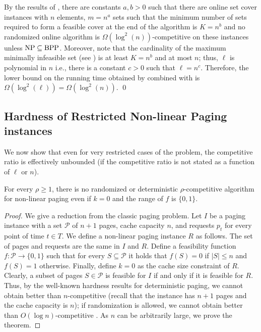 \documentclass[11pt]{article}
\newcommand{\cP}{{\mathcal{P}}}
\begin{document}
{By the results of \cite{korman2004use}, there are constants $a,b>0$ such that there are online set cover instances with $n$ elements, $m = n^a$ sets such that the minimum number of sets required to form a feasible cover at the end of the algorithm is $K = n^b$ and no randomized online algorithm is $\Omega(\log^2\left(n\right))$-competitive on these instances unless $\textnormal{NP}\subseteq \textnormal{BPP}$. Moreover, note that the cardinality of the maximum minimally infeasible set (see ) is at least $K = n^b$ and at most $n$; thus, $\ell$ is polynomial in $n$ i.e., there is a constant $c>0$ such that $\ell = n^c$. Therefore, the lower bound on the running time obtained by  combined with \cite{korman2004use} is $\Omega(\log^2\left(\ell\right)) = \Omega(\log^2\left(n\right))$. \qed


\subsection{Hardness of Restricted Non-linear Paging instances}
\label{sec:hardRestricted}

We now show that even for very restricted cases of the problem, the competitive ratio is effectively unbounded (if the competitive ratio is not stated as a function of $\ell$ or $n$). 

\begin{theorem}
\label{thm:HardnessRestricted}
For every $\rho \geq 1$, there is no randomized or deterministic $\rho$-competitive algorithm for \textnormal{non-linear paging} even if $k = 0$ and the range of $f$ is $\{0,1\}$.
\end{theorem}

\begin{proof}
We give a reduction from the classic paging problem. Let $I$ be a paging instance with a set $\cP$ of $n+1$ pages, cache capacity $n$, and requests $p_t$ for every point of time $t \in T$. We define a non-linear paging instance $R$ as follows. The set of pages and requests are the same in $I$ and $R$. Define a feasibility function $f:\cP \rightarrow \{0,1\}$ such that for every $S \subseteq \cP$ it holds that $f(S) = 0$ if $|S| \leq n$ and $f(S) = 1$ otherwise. Finally, define $k = 0$ as the cache size constraint of $R$. Clearly, a subset of pages $S \in \cP$ is feasible for $I$ if and only if it is feasible for $R$. Thus, by the well-known hardness results for deterministic paging, we cannot obtain better than $n$-competitive \cite{sleator1985amortized} (recall that the instance has $n+1$ pages and the cache capacity is $n$); if randomization is allowed, we cannot obtain better than $O(\log n)$-competitive \cite{fiat1991competitive}. As $n$ can be arbitrarily large, we prove the theorem.  
\end{proof}
}
\end{document}
